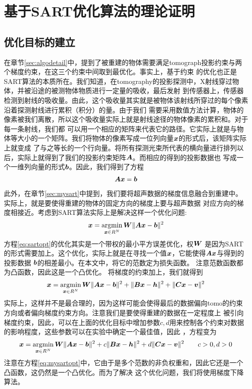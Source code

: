 \section{基于SART优化算法的理论证明}
\subsection{优化目标的建立}\label{sec:optobj}
在章节\ref{sec:algodetail}中，提到了被重建的物体需要满足tomograph投影约束与两个梯度约束，在这三个约束中间取到最优化。事实上，基于约束
的优化也正是SART算法的本质所在。我们知道，在tomography的投影探测中，X射线穿过物体，并被沿途的被测物体物质进行一定量的吸收，最后发射
到传感器上，传感器检测到射线的吸收量。由此，这个吸收量其实就是被物体该射线所穿过的每个像素沿着探测射线进行累积（积分）的量。由于我们
需要采用数值方法计算，物体的像素被我们离散，所以这个吸收量实际上就是射线途径的物体像素的累积和。对于每一条射线，我们都
可以用一个相应的矩阵来代表它的路径。它实际上就是与物体等大小的一个矩阵。我们将物体的像素写成一位列向量$\bm{ x}$的形式后，该矩阵实际上就变成
了与之等长的一个行向量。将所有探测光束所代表的横向量进行排列以后，实际上就得到了我们的投影约束矩阵$\bm{A}$。而相应的得到的投影数据也
写成一个一维列向量的形式$\bm{b}$。因此，我们得到了方程
\begin{equation}
\bm{A}\bm{ x} = \bm{b} \label{eq:tomocon}
\end{equation}
此外，在章节\ref{sec:mysart}中提到，我们要将超声数据的梯度信息融合到重建中。实际上，就是要使得重建的物体的固定方向的梯度上要与超声数据
对应方向的梯度相接近。考虑到SART算法实际上是解决这样一个优化问题:
\begin{equation}
\bm{ x} = \operatorname*{\arg\!\min}_{\bm{ x}\in R^N}\bm{W}\lVert\bm{A}\bm{ x}-\bm{b}\rVert^2 \label{eq:sartopt}
\end{equation}
方程\eqref{eq:sartopt}的优化其实是一个带权的最小平方误差优化，权$\bm{W}$ 是因为SART的形式需要加上。这个优化，实际上就是在寻找一个值$\bm{ x}$，它能使得$\bm{A}\bm{ x}$与得到的投影数据 $\bm{b}$的相差最小。在本文中，将它的范数定为损失函数。
注意范数函数都为凸函数，因此这是一个凸优化。
将梯度的约束加上，我们就得到
\begin{equation}
\bm{ x} = \operatorname*{\arg\!\min}_{\bm{ x}\in R^N}\bm{W}\lVert\bm{A}\bm{ x}-\bm{b}\rVert^2 +\lVert\bm{B}\bm{ x}-\bm{h}\rVert^2+\lVert\bm{C}\bm{ x}-\bm{v}\rVert^2 \notag
\end{equation}
实际上，这样并不是最合理的，因为这样可能会使得最后的数据偏向tomo的约束方向或者偏向梯度约束方向。注意我们是要使得重建的数据在一定程度上
被引向梯度约束，因此，可以在上面的优化目标中增加参数$c,d$用来控制各个约束对数据的影响程度，这些参数可以在实验中确定一个最佳值，因此
，方程变为
\begin{equation}
\bm{ x} = \operatorname*{\arg\!\min}_{\bm{ x}\in R^N}\bm{W}\lVert\bm{A}\bm{ x}-\bm{b}\rVert^2 +c\lVert\bm{B}\bm{ x}-\bm{h}\rVert^2+d\lVert\bm{C}\bm{ x}-\bm{v}\rVert^2 \qquad c>0,d>0 \label{eq:mysartopt}
\end{equation}
注意在方程\eqref{eq:mysartopt}中，它由于是多个范数的非负权重和，因此它还是一个凸函数\cite{boyd2004convex}，这仍然是一个凸优化。而为了解决
这个优化问题，我们将使用梯度下降算法\cite{nesterov2003}。



